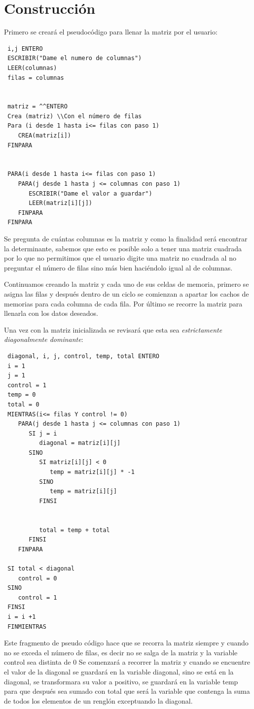 \documentclass{article}
\begin{document}
\section{Construcción}
Primero se creará el pseudocódigo para llenar la matriz por el usuario:
\begin{verbatim}
 i,j ENTERO
 ESCRIBIR("Dame el numero de columnas")
 LEER(columnas)
 filas = columnas


 matriz = ^^ENTERO
 Crea (matriz) \\Con el número de filas
 Para (i desde 1 hasta i<= filas con paso 1)
    CREA(matriz[i])  
 FINPARA


 PARA(i desde 1 hasta i<= filas con paso 1)
    PARA(j desde 1 hasta j <= columnas con paso 1)
       ESCRIBIR("Dame el valor a guardar")
       LEER(matriz[i][j])
    FINPARA
 FINPARA
\end{verbatim}


Se pregunta de cuántas columnas es la matriz y como la finalidad será encontrar la
determinante, sabemos que esto es posible solo a tener una matriz cuadrada por lo que
no permitimos que el usuario digite una matriz no cuadrada al no preguntar el número
de filas sino más bien haciéndolo igual al de columnas.


Continuamos creando la matriz y cada uno de sus celdas de memoria, primero se asigna
las filas y después dentro de un ciclo se comienzan a apartar los cachos de memorias
para cada columna de cada fila.
Por último se recorre la matriz para llenarla con los datos deseados.


Una vez con la matriz inicializada se revisará que esta sea \emph{estrictamente diagonalmente dominante}:


\begin{verbatim}
 diagonal, i, j, control, temp, total ENTERO
 i = 1
 j = 1
 control = 1
 temp = 0
 total = 0
 MIENTRAS(i<= filas Y control != 0)
    PARA(j desde 1 hasta j <= columnas con paso 1)
       SI j = i
          diagonal = matriz[i][j]
       SINO 
          SI matriz[i][j] < 0
             temp = matriz[i][j] * -1
          SINO
             temp = matriz[i][j]
          FINSI


          total = temp + total
       FINSI
    FINPARA

 SI total < diagonal
    control = 0
 SINO
    control = 1
 FINSI
 i = i +1
 FINMIENTRAS
\end{verbatim}


Este fragmento de pseudo código hace que se recorra la matriz siempre y cuando no se exceda
el número de filas, es decir no se salga de la matriz y la variable control sea distinta de 0
Se comenzará a recorrer la matriz y cuando se encuentre el valor de la diagonal se guardará
en la variable diagonal, sino se está en la diagonal, se transformara su valor a positivo, se
guardará en la variable temp para que después sea sumado con total que será la variable que contenga
la suma de todos los elementos de un renglón exceptuando la diagonal.
\end{document}
